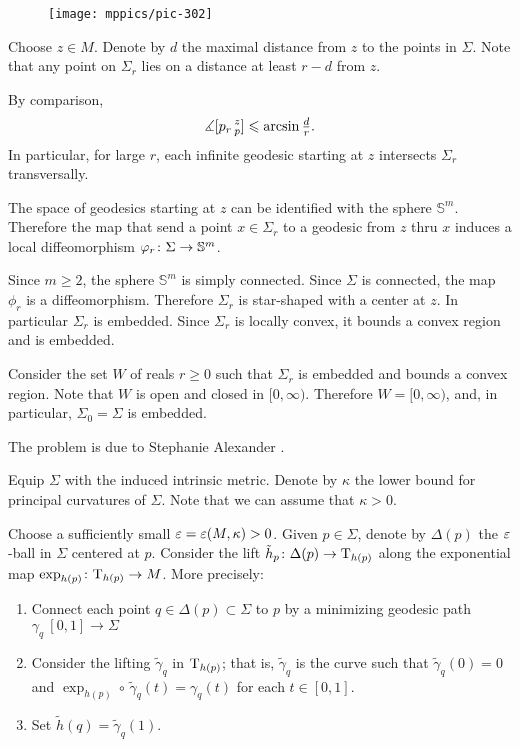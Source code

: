 \begin{wrapfigure}{r}{60 mm}
\vskip0mm
\centering
\texttt{[image: mppics/pic-302]}
\end{wrapfigure}

Choose $z\in M$. 
Denote by $d$ the maximal distance from $z$ to the points in $\Sigma$.
Note that 
any point on $\Sigma_r$
lies on a distance at least $r-d$ from $z$.

By comparison, 
\[\measuredangle[p_r\,{}^{z}_{p}]\leqslant \arcsin\tfrac dr.\]
In particular, for large $r$, 
each infinite geodesic starting at $z$ intersects $\Sigma_r$ transversally.

The space of geodesics starting at $z$ can be identified with the sphere $\mathbb{S}^m$.
Therefore the map that send a point $x\in \Sigma_r$ to a geodesic from $z$ thru $x$ induces a local diffeomorphism $\phi_r\:\Sigma\z\to\mathbb{S}^m$.

Since $m\ge 2$, the sphere $\mathbb{S}^m$ is simply connected.
Since $\Sigma$ is connected, the map $\phi_r$ is a diffeomorphism.
Therefore $\Sigma_r$ is star-shaped with a center at $z$.
In particular $\Sigma_r$ is embedded.
Since $\Sigma_r$ is locally convex, it bounds a convex region and is embedded.

Consider the set $W$ of reals $r\ge 0$ such that $\Sigma_r$ is embedded and bounds a convex region.
Note that $W$ is open and closed in $[0,\infty)$.
Therefore $W=[0,\infty)$, and, in particular, $\Sigma_0=\Sigma$ is embedded.\qeds

The problem is due to Stephanie Alexander \cite{alexander}.



Equip $\Sigma$ with the induced intrinsic metric.
Denote by $\kappa$ the lower bound for principal curvatures of $\Sigma$.
Note that we can assume that $\kappa>0$.

Choose a sufficiently small $\varepsilon=\varepsilon(M,\kappa)>0$.
Given $p\in \Sigma$, denote by $\Delta(p)$ the $\varepsilon$-ball in $\Sigma$ centered at $p$.
Consider the lift $\tilde h_p\colon\Delta(p)\to \mathrm{T}_{h(p)}$ along the exponential map $\exp_{h(p)}\colon\mathrm{T}_{h(p)}\to M$.
More precisely:
\begin{enumerate}
\item Connect each point $q\in \Delta(p)\subset \Sigma$ to $p$
by a minimizing geodesic  path $\gamma_q\:[0,1]\to \Sigma$
\item Consider the lifting $\tilde\gamma_q$ in $\mathrm{T}_{h(p)}$; 
that is, $\tilde\gamma_q$ is the curve such that $\tilde\gamma_q(0)=0$ 
and $\exp_{h(p)}\circ\,\tilde\gamma_q(t)=\gamma_q(t)$ for each $t\in[0,1]$.
 \item Set $\tilde h(q)=\tilde\gamma_q(1)$.
\end{enumerate}

